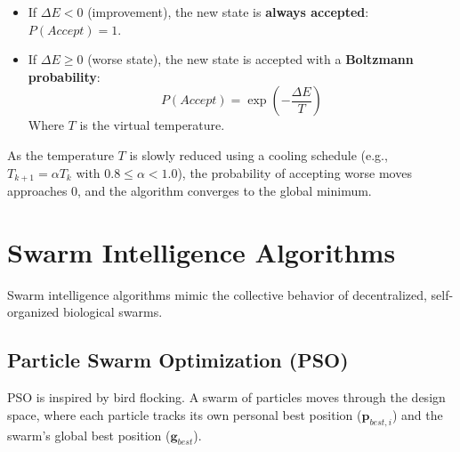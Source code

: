 \documentclass[12pt,a4paper]{article}
\begin{document}
\begin{tcolorbox}[formulabox, title={Metropolis Criterion Equations}]
\begin{itemize}[leftmargin=*, itemsep=3.5pt, topsep=0pt]
  \item If $\Delta E < 0$ (improvement), the new state is \textbf{always accepted}: $P(Accept) = 1$.
  \item If $\Delta E \ge 0$ (worse state), the new state is accepted with a \textbf{Boltzmann probability}:
    \begin{equation}
      P(Accept) = \exp\left( -\frac{\Delta E}{T} \right)
    \end{equation}
    Where $T$ is the virtual temperature.
\end{itemize}
\par\vspace{3pt}
As the temperature $T$ is slowly reduced using a cooling schedule (e.g., $T_{k+1} = \alpha T_k$ with $0.8 \le \alpha < 1.0$), the probability of accepting worse moves approaches 0, and the algorithm converges to the global minimum.
\end{tcolorbox}

\section{Swarm Intelligence Algorithms}

Swarm intelligence algorithms mimic the collective behavior of decentralized, self-organized biological swarms.

\subsection{Particle Swarm Optimization (PSO)}
PSO is inspired by bird flocking. A swarm of particles moves through the design space, where each particle tracks its own personal best position ($\mathbf{p}_{best, i}$) and the swarm's global best position ($\mathbf{g}_{best}$).
\end{document}
